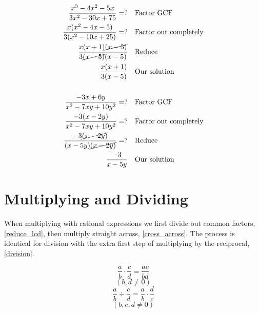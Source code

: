    \begin{align*}
   		\frac{x^3-4x^2-5x}{3x^2-30x+75}=?&	&&\text{Factor GCF}\\
         \frac{x(x^2-4x-5)}{3(x^2-10x+25)}=?&	&&\text{Factor out completely}\\
         \frac{x(x+1)\cancel{(x-5)}}{3\cancel{(x-5)}(x-5)}&	&&\text{Reduce}\\
         \frac{x(x+1)}{3(x-5)}&	&&\text{Our solution}\\
         &&&\\
         \frac{-3x+6y}{x^2-7xy+10y^2}=?&	&&\text{Factor GCF}\\
         \frac{-3(x-2y)}{x^2-7xy+10y^2}=?&	&&\text{Factor out completely}\\
         \frac{-3\cancel{(x-2y)}}{(x-5y)\cancel{(x-2y)}}=?&	&&\text{Reduce}\\
         \frac{-3}{x-5y}& &&\text{Our solution}
   \end{align*}
\section{Multiplying and Dividing}
When multiplying with rational expressions we first divide out common factors,\eqref{reduce_lcd}, then multiply straight across, \eqref{cross_across}. The process is identical for division with the extra first step of multiplying by the reciprocal, \eqref{division}.
\begin{tcolorbox}[title=Multiplication,fonttitle=\bfseries]
        	\begin{equation} 
            	\frac{a}{b}\cdot \frac{c}{d}=\frac{ac}{bd} \label{cross_across}
            \end{equation}
                        \[(b, d\neq0)\]
        	\begin{equation} 
            	\frac{a}{b}\div \frac{c}{d}=\frac{a}{b}\cdot\frac{d}{c}
                \label{division}
            \end{equation}
                        \[(b,c,d\neq 0) \]
\end{tcolorbox}


